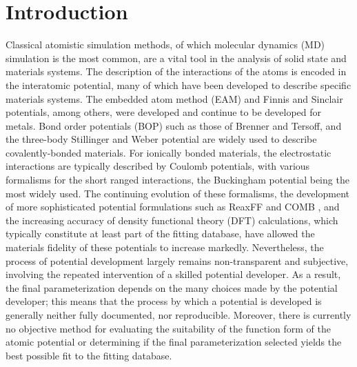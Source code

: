 \section{Introduction}
Classical atomistic simulation methods, of which molecular dynamics (MD) simulation\cite{allen1987_md,haile1992_md,lesar2013_md,frenkel2002_md} is the most common, are a vital tool in the analysis of solid state and materials systems.
The description of the interactions of the atoms is encoded in the interatomic potential, many of which have been developed to describe specific materials systems.
The embedded atom method (EAM)\cite{daw1983_eam,daw1984_eam,daw1993_eam_review,foiles2012_eam_review} and Finnis and Sinclair\cite{finnis1984_fs} potentials, among others, were developed and continue to be developed for metals.
Bond order potentials (BOP) such as those of Brenner\cite{brenner1989_bop,brenner2002_rebo} and Tersoff\cite{tersoff1988_tersoff}, and the three-body Stillinger and Weber\cite{stillinger1985_sw} potential are widely used to describe covalently-bonded materials.
For ionically bonded materials, the electrostatic interactions are typically described by Coulomb potentials, with various formalisms for the short ranged interactions, the Buckingham potential being the most widely used.\cite{lewis1985_buck,gale1996_buck}
The continuing evolution of these formalisms, the development of more sophisticated potential formulations such as ReaxFF\cite{vanduin2001_reaxff,senftle2016_reaxff} and COMB \cite{liang2013_comb_1,liang2013_comb_2}, and the increasing accuracy of density functional theory (DFT) calculations, which typically constitute at least part of the fitting database, have allowed the materials fidelity of these potentials to increase markedly.
Nevertheless, the process of potential development largely remains non-transparent and subjective, involving the repeated intervention of a skilled potential developer.\cite{brenner2000_fitting,martinez2013_fitting,martinez2016_posmat}
As a result, the final parameterization depends on the many choices made by the potential developer; this means that the process by which a potential is developed is generally neither fully documented, nor reproducible.
Moreover, there is currently no objective method for evaluating the suitability of the function form of the atomic potential or determining if the final parameterization selected yields the best possible fit to the fitting database.

